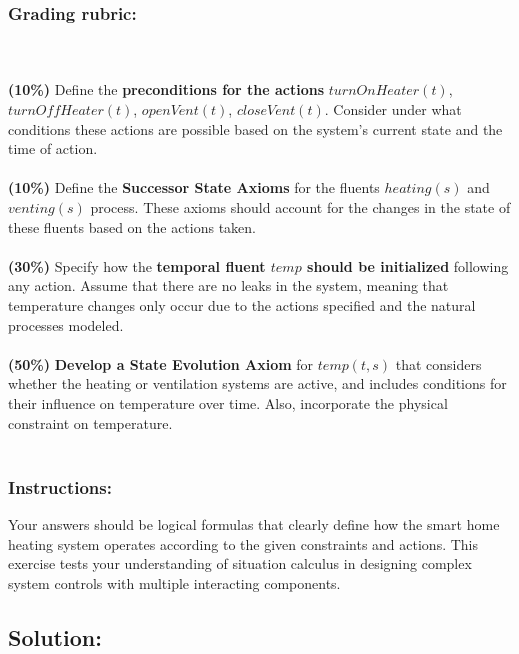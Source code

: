 \documentclass{assignment}
\begin{document}
\begin{problem}
\subsubsection*{Grading rubric:}
\\\\
{\textbf{(10\%)}} Define the \textbf{preconditions for the actions} $turnOnHeater(t)$, $turnOffHeater(t)$, $openVent(t)$, $closeVent(t)$. Consider under what conditions these actions are possible based on the system's current state and the time of action.\\
\\
{\textbf{(10\%)}} Define the \textbf{Successor State Axioms} for the fluents $heating(s)$ and $venting(s)$ process. These axioms should account for the changes in the state of these fluents based on the actions taken.\\
\\
{\textbf{(30\%)}} Specify how the \textbf{temporal fluent $temp$ should be initialized} following any action. Assume that there are no leaks in the system, meaning that temperature changes only occur due to the actions specified and the natural processes modeled.\\
\\
{\textbf{(50\%)}} \textbf{Develop a State Evolution Axiom} for $temp(t, s)$ that considers whether the heating or ventilation systems are active, and includes conditions for their influence on temperature over time. Also, incorporate the physical constraint on temperature.\\
\\
\subsubsection*{Instructions:}
Your answers should be logical formulas that clearly define how the smart home heating system operates according to the given constraints and actions. This exercise tests your understanding of situation calculus in designing complex system controls with multiple interacting components.

\subsection*{Solution:}


\end{problem}
\end{document}
